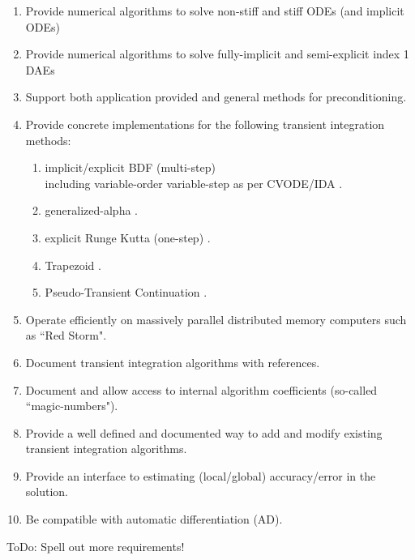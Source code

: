 \documentclass[pdf,ps2pdf,11pt]{SANDreport}
\begin{document}
\begin{enumerate}
{}\item Provide numerical algorithms to solve non-stiff and stiff ODEs (and implicit ODEs)

{}\item Provide numerical algorithms to solve fully-implicit and semi-explicit index 1 DAEs

{}\item Support both application provided and general methods for preconditioning.

{}\item Provide concrete implementations for the following transient integration methods:
  \begin{enumerate}
  {}\item implicit/explicit BDF (multi-step) \\
        including variable-order variable-step as per CVODE/IDA \cite{CVODE,IDA}.
  {}\item generalized-alpha \cite{GeneralizedAlpha}.
  {}\item explicit Runge Kutta (one-step) \cite{ERKMethods}.
  {}\item Trapezoid \cite{Trapezoid}.
  {}\item Pseudo-Transient Continuation \cite{PTC,PTCDAE}.
  \end{enumerate}

{}\item Operate efficiently on massively parallel distributed memory computers such as ``Red Storm".

{}\item Document transient integration algorithms with references.

{}\item Document and allow access to internal algorithm coefficients (so-called ``magic-numbers").

{}\item Provide a well defined and documented way to add and modify existing transient integration algorithms.

{}\item Provide an interface to estimating (local/global) accuracy/error in the solution.

{}\item Be compatible with automatic differentiation (AD).

\end{enumerate}

ToDo: Spell out more requirements!
\end{document}
